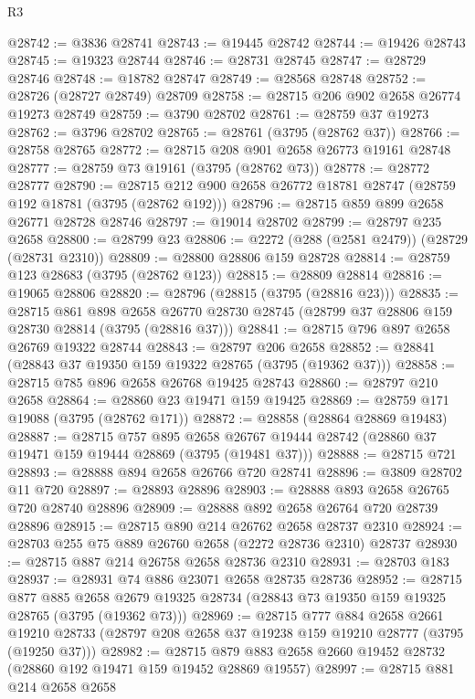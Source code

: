 \begin{lexlean}{R3}
\begin{coremodule}
@28742 := @3836 @28741
@28743 := @19445 @28742
@28744 := @19426 @28743
@28745 := @19323 @28744
@28746 := @28731 @28745
@28747 := @28729 @28746
@28748 := @18782 @28747
@28749 := @28568 @28748
@28752 := @28726 (@28727 @28749) @28709
@28758 := @28715 @206 @902 @2658 @26774 @19273 @28749
@28759 := @3790 @28702
@28761 := @28759 @37 @19273
@28762 := @3796 @28702
@28765 := @28761 (@3795 (@28762 @37))
@28766 := @28758 @28765
@28772 := @28715 @208 @901 @2658 @26773 @19161 @28748
@28777 := @28759 @73 @19161 (@3795 (@28762 @73))
@28778 := @28772 @28777
@28790 := @28715 @212 @900 @2658 @26772 @18781 @28747 (@28759 @192 @18781 (@3795 (@28762 @192)))
@28796 := @28715 @859 @899 @2658 @26771 @28728 @28746
@28797 := @19014 @28702
@28799 := @28797 @235 @2658
@28800 := @28799 @23
@28806 := @2272 (@288 (@2581 @2479)) (@28729 (@28731 @2310))
@28809 := @28800 @28806 @159 @28728
@28814 := @28759 @123 @28683 (@3795 (@28762 @123))
@28815 := @28809 @28814
@28816 := @19065 @28806
@28820 := @28796 (@28815 (@3795 (@28816 @23)))
@28835 := @28715
    @861
    @898
    @2658
    @26770
    @28730
    @28745
    (@28799 @37 @28806 @159 @28730 @28814 (@3795 (@28816 @37)))
@28841 := @28715 @796 @897 @2658 @26769 @19322 @28744
@28843 := @28797 @206 @2658
@28852 := @28841 (@28843 @37 @19350 @159 @19322 @28765 (@3795 (@19362 @37)))
@28858 := @28715 @785 @896 @2658 @26768 @19425 @28743
@28860 := @28797 @210 @2658
@28864 := @28860 @23 @19471 @159 @19425
@28869 := @28759 @171 @19088 (@3795 (@28762 @171))
@28872 := @28858 (@28864 @28869 @19483)
@28887 := @28715
    @757
    @895
    @2658
    @26767
    @19444
    @28742
    (@28860 @37 @19471 @159 @19444 @28869 (@3795 (@19481 @37)))
@28888 := @28715 @721
@28893 := @28888 @894 @2658 @26766 @720 @28741
@28896 := @3809 @28702 @11 @720
@28897 := @28893 @28896
@28903 := @28888 @893 @2658 @26765 @720 @28740 @28896
@28909 := @28888 @892 @2658 @26764 @720 @28739 @28896
@28915 := @28715 @890 @214 @26762 @2658 @28737 @2310
@28924 := @28703 @255 @75 @889 @26760 @2658 (@2272 @28736 @2310) @28737
@28930 := @28715 @887 @214 @26758 @2658 @28736 @2310
@28931 := @28703 @183
@28937 := @28931 @74 @886 @23071 @2658 @28735 @28736
@28952 := @28715
    @877
    @885
    @2658
    @2679
    @19325
    @28734
    (@28843 @73 @19350 @159 @19325 @28765 (@3795 (@19362 @73)))
@28969 := @28715
    @777
    @884
    @2658
    @2661
    @19210
    @28733
    (@28797 @208 @2658 @37 @19238 @159 @19210 @28777 (@3795 (@19250 @37)))
@28982 := @28715 @879 @883 @2658 @2660 @19452 @28732 (@28860 @192 @19471 @159 @19452 @28869 @19557)
@28997 := @28715
    @881
    @214
    @2658
    @2658

\end{coremodule}
\end{lexlean}

